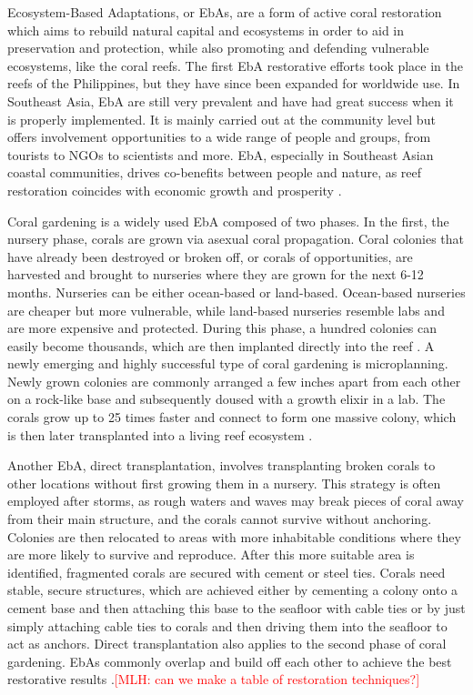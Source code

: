 \documentclass{book}\usepackage{knitr}
\newcommand{\red}[1]{\textcolor{red}{[MLH: #1]}}
\begin{document}
{Ecosystem-Based Adaptations, or EbAs, are a form of active coral restoration which aims to rebuild natural capital and ecosystems in order to aid in preservation and protection, while also promoting and defending vulnerable ecosystems, like the coral reefs. The first EbA restorative efforts took place in the reefs of the Philippines, but they have since been expanded for worldwide use. In Southeast Asia, EbA are still very prevalent and have had great success when it is properly implemented. It is mainly carried out at the community level but offers involvement opportunities to a wide range of people and groups, from tourists to NGOs to scientists and more. EbA, especially in Southeast Asian coastal communities, drives co-benefits between people and nature, as reef restoration coincides with economic growth and prosperity \citep{14551496520201201}.

Coral gardening is a widely used EbA composed of two phases. In the first, the nursery phase, corals are grown via asexual coral propagation. Coral colonies that have already been destroyed or broken off, or corals of opportunities, are harvested and brought to nurseries where they are grown for the next 6-12 months. Nurseries can be either ocean-based or land-based. Ocean-based nurseries are cheaper but more vulnerable, while land-based nurseries resemble labs and are more expensive and protected.  During this phase, a hundred colonies can easily become thousands, which are then implanted directly into the reef \citep{cgarden}. A newly emerging and highly successful type of coral gardening is microplanning. Newly grown colonies are commonly arranged a few inches apart from each other on a rock-like base and subsequently doused with a growth elixir in a lab. The corals grow up to 25 times faster and connect to form one massive colony, which is then later transplanted into a living reef ecosystem \citep{Morin_2014}.

Another EbA, direct transplantation, involves transplanting broken corals to other locations without first growing them in a nursery. This strategy is often employed after storms, as rough waters and waves may break pieces of coral away from their main structure, and the corals cannot survive without anchoring. Colonies are then relocated to areas with more inhabitable conditions where they are more likely to survive and reproduce. After this more suitable area is identified, fragmented corals are secured with cement or steel ties. Corals need stable, secure structures, which are achieved either by cementing a colony onto a cement base and then attaching this base to the seafloor with cable ties or by just simply attaching cable ties to corals and then driving them into the seafloor to act as anchors. Direct transplantation also applies to the second phase of coral gardening. EbAs commonly overlap and build off each other to achieve the best restorative results \citep{areef}.\red{can we make a table of restoration techniques?}

}
\end{document}
